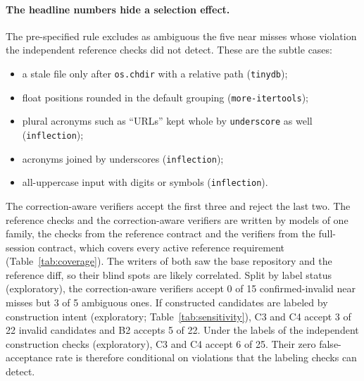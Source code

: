 \paragraph{The headline numbers hide a selection effect.} The pre-specified rule excludes as ambiguous the five near misses whose violation the independent reference checks did not detect. These are the subtle cases:
\begin{itemize}
\item a stale file only after \texttt{os.chdir} with a relative path (\texttt{tinydb});
\item float positions rounded in the default grouping (\texttt{more-itertools});
\item plural acronyms such as ``URLs'' kept whole by \texttt{underscore} as well (\texttt{inflection});
\item acronyms joined by underscores (\texttt{inflection});
\item all-uppercase input with digits or symbols (\texttt{inflection}).
\end{itemize}
The correction-aware verifiers accept the first three and reject the last two. The reference checks and the correction-aware verifiers are written by models of one family, the checks from the reference contract and the verifiers from the full-session contract, which covers every active reference requirement (Table~\ref{tab:coverage}). The writers of both saw the base repository and the reference diff, so their blind spots are likely correlated. Split by label status (exploratory), the correction-aware verifiers accept 0 of 15 confirmed-invalid near misses but 3 of 5 ambiguous ones. If constructed candidates are labeled by construction intent (exploratory; Table~\ref{tab:sensitivity}), C3 and C4 accept 3 of 22 invalid candidates and B2 accepts 5 of 22. Under the labels of the independent construction checks (exploratory), C3 and C4 accept 6 of 25. Their zero false-acceptance rate is therefore conditional on violations that the labeling checks can detect.

